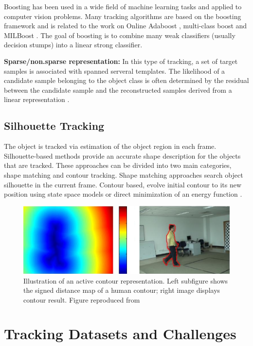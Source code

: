 Boosting has been used in a wide field of machine learning tasks and
applied to computer vision problems. Many tracking algorithms are based on the
boosting framework \cite{Freund1997a} and is related to the work on
Online Adaboost \cite{Avidan2007,Grabner2008,Oza2000}, multi-class boost
\cite{Saffari2010} and MILBoost \cite{Babenko2010}. The goal of boosting is
to combine many weak classifiers (usually decision stumps) into a linear
strong classifier.

\textbf{Sparse/non.sparse representation: } In this type of tracking, a set of
target samples is associated with spanned serveral templates. The likelihood
of a candidate sample belonging to the object class is often determined by the
residual between the candidate sample and the reconstructed samples derived from
a linear representation \cite{Zhang2012b,Zhang2012a,Bao2012,Mei2011a,Mei2011}.

\subsection{Silhouette Tracking}

The object is tracked via estimation of the object region in each frame.
Silhouette-based methods provide an accurate shape description for the
objects that are tracked. These approaches can be divided into two main
categories, shape matching and contour tracking. Shape matching \cite{Li2001}
approaches search object silhouette in the current frame. Contour based, evolve
initial contour to its new position using state space models or direct
minimization of an energy function \cite{Cremers2003}.

\begin{figure}[h!]
	\centering
		\includegraphics[width=0.9\linewidth]{Figures/contour.png}
	\caption[Illustration of an active contour representation]
			{Illustration of an active contour representation. Left subfigure
			shows the signed distance map of a human contour; right
			image displays contour result. Figure reproduced from \cite{Yilmaz2006}}
	\label{fig::contour}
\end{figure}	
\section{Tracking Datasets and Challenges}
\label{sec::datasets}

